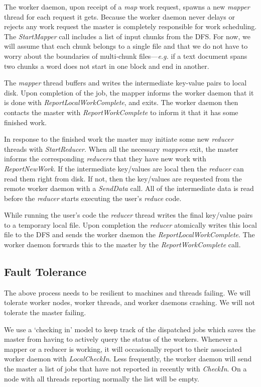 \documentclass[10pt,letter,final,article,twocolumn]{article} %
\newcommand{\rpc}[1]{\emph{#1}}
\begin{document}
The worker daemon, upon receipt of a \emph{map} work request, spawns a new \emph{mapper} thread for each request it gets. Because the worker daemon never delays or rejects any work request the master is completely responsible for work scheduling. The  \rpc{StartMapper} call includes a list of input chunks from the DFS. For now, we will assume that each chunk belongs to a single file and that we do not have to worry about the boundaries of multi-chunk files---\textit{e.g.} if a text document spans two chunks a word does not start in one block and end in another.

The \emph{mapper} thread buffers and writes the intermediate key-value pairs to local disk. Upon completion of the job, the mapper informs the worker daemon that it is done with \rpc{ReportLocalWorkComplete}, and exits. The worker daemon then contacts the master with \rpc{ReportWorkComplete} to inform it that it has some finished work.

In response to the finished work the master may initiate some new \emph{reducer} threads with \rpc{StartReducer}. When all the necessary \emph{mappers} exit, the master informs the corresponding \emph{reducers} that they have new work with \rpc{ReportNewWork}. If the intermediate key/values  are local then the \emph{reducer} can read them right from disk. If not, then the key/values are requested from the remote worker daemon with a \rpc{SendData} call. All of the intermediate data is read before the \emph{reducer} starts executing the user's \emph{reduce} code.

While running the user's code the \emph{reducer} thread writes the final key/value pairs to a temporary local file. Upon completion the \emph{reducer} atomically writes this local file to the DFS and sends the worker daemon the \rpc{ReportLocalWorkComplete}. The worker daemon forwards this to the master by the \rpc{ReportWorkComplete} call.

\subsection{Fault Tolerance}
The above process needs to be resilient to machines and threads failing. We will tolerate worker nodes, worker threads, and worker daemons crashing. We will not tolerate the master failing.

We use a `checking in' model to keep track of the dispatched jobs which saves the master from having to actively query the status of the workers. Whenever a mapper or a reducer is working, it will occasionally report to their associated worker daemon with \rpc{LocalCheckIn}. Less frequently, the worker daemon will send the master a list of jobs that have not reported in recently with \rpc{CheckIn}. On a node with all threads reporting normally the list will be empty.
\end{document}
